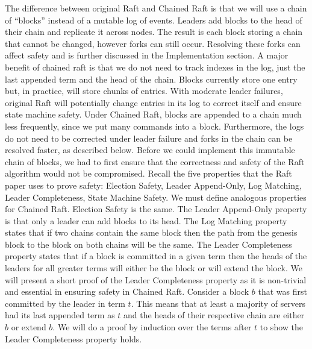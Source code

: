 	The difference between original Raft and Chained Raft is that we will use a chain of “blocks” instead of a mutable log of events. 
    Leaders add blocks to the head of their chain and replicate it across nodes. 
    The result is each block storing a chain that cannot be changed, however forks can still occur. 
    Resolving these forks can affect safety and is further discussed in the Implementation section. 
    A major benefit of chained raft is that we do not need to track indexes in the log, just the last appended term and the head of the chain. 
    Blocks currently store one entry but, in practice, will store chunks of entries.
    With moderate leader failures, original Raft will potentially change entries in its log to correct itself and ensure state machine safety. 
    Under Chained Raft, blocks are appended to a chain much less frequently, since we put many commands into a block. 
    Furthermore, the logs do not need to be corrected under leader failure and forks in the chain can be resolved faster, as described below. 
Before we could implement this immutable chain of blocks, we had to first ensure that the correctness and safety of the Raft algorithm would not be compromised. 
Recall the five properties that the Raft paper uses to prove safety: Election Safety, Leader Append-Only, Log Matching, Leader Completeness, State Machine Safety. 
We must define analogous properties for Chained Raft. 
Election Safety is the same. 
The Leader Append-Only property is that only a leader can add blocks to its head. 
The Log Matching property states that if two chains contain the same block then the path from the genesis block to the block on both chains will be the same. 
The Leader Completeness property states that if a block is committed in a given term then the heads of the leaders for all greater terms will either be the block or will extend the block. 
We will present a short proof of the Leader Completeness property as it is non-trivial and essential in ensuring safety in Chained Raft. 
	Consider a block $b$ that was first committed by the leader in term $t$. 
    This means that at least a majority of servers had its last appended term as $t$ and the heads of their respective chain are either $b$ or extend $b$. We will do a proof by induction over the terms after $t$ to show the Leader Completeness property holds. 
